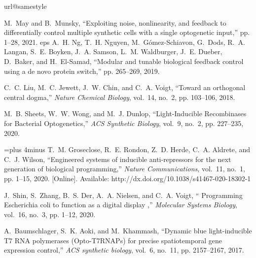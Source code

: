 \documentclass[12pt]{article}
\begin{document}
\begin{thebibliography}{10}
\providecommand{\url}[1]{#1}
\csname url@samestyle\endcsname
\providecommand{\newblock}{\relax}
\providecommand{\bibinfo}[2]{#2}
\providecommand{\BIBentrySTDinterwordspacing}{\spaceskip=0pt\relax}
\providecommand{\BIBentryALTinterwordstretchfactor}{4}
\providecommand{\BIBentryALTinterwordspacing}{\spaceskip=\fontdimen2\font plus
\BIBentryALTinterwordstretchfactor\fontdimen3\font minus
  \fontdimen4\font\relax}
\providecommand{\BIBforeignlanguage}[2]{{%
\expandafter\ifx\csname l@#1\endcsname\relax
\typeout{** WARNING: IEEEtran.bst: No hyphenation pattern has been}%
\typeout{** loaded for the language `#1'. Using the pattern for}%
\typeout{** the default language instead.}%
\else
\language=\csname l@#1\endcsname
\fi
#2}}
\providecommand{\BIBdecl}{\relax}
\BIBdecl

M.~May and B.~Munsky, ``{Exploiting noise, nonlinearity, and feedback to
  differentially control multiple synthetic cells with a single optogenetic
  input},'' pp. 1--28, 2021.
eps
A.~H. Ng, T.~H. Nguyen, M.~G{\'{o}}mez-Schiavon, G.~Dods, R.~A. Langan, S.~E.
  Boyken, J.~A. Samson, L.~M. Waldburger, J.~E. Dueber, D.~Baker, and
  H.~El-Samad, ``{Modular and tunable biological feedback control using a de
  novo protein switch},'' pp. 265--269, 2019.

C.~C. Liu, M.~C. Jewett, J.~W. Chin, and C.~A. Voigt, ``{Toward an orthogonal
  central dogma},'' \emph{Nature Chemical Biology}, vol.~14, no.~2, pp.
  103--106, 2018.

M.~B. Sheets, W.~W. Wong, and M.~J. Dunlop, ``{Light-Inducible Recombinases for
  Bacterial Optogenetics},'' \emph{ACS Synthetic Biology}, vol.~9, no.~2, pp.
  227--235, 2020.

\BIBentryALTinterwordspacing
T.~M. Groseclose, R.~E. Rondon, Z.~D. Herde, C.~A. Aldrete, and C.~J. Wilson,
  ``{Engineered systems of inducible anti-repressors for the next generation of
  biological programming},'' \emph{Nature Communications}, vol.~11, no.~1, pp.
  1--15, 2020. [Online]. Available:
  \url{http://dx.doi.org/10.1038/s41467-020-18302-1}
\BIBentrySTDinterwordspacing

J.~Shin, S.~Zhang, B.~S. Der, A.~A. Nielsen, and C.~A. Voigt, ``{ Programming
  Escherichia coli to function as a digital display },'' \emph{Molecular
  Systems Biology}, vol.~16, no.~3, pp. 1--12, 2020.

A.~Baumschlager, S.~K. Aoki, and M.~Khammash, ``{Dynamic blue light-inducible
  T7 RNA polymerases (Opto-T7RNAPs) for precise spatiotemporal gene expression
  control},'' \emph{ACS synthetic biology}, vol.~6, no.~11, pp. 2157--2167,
  2017.


\end{thebibliography}
\end{document}

